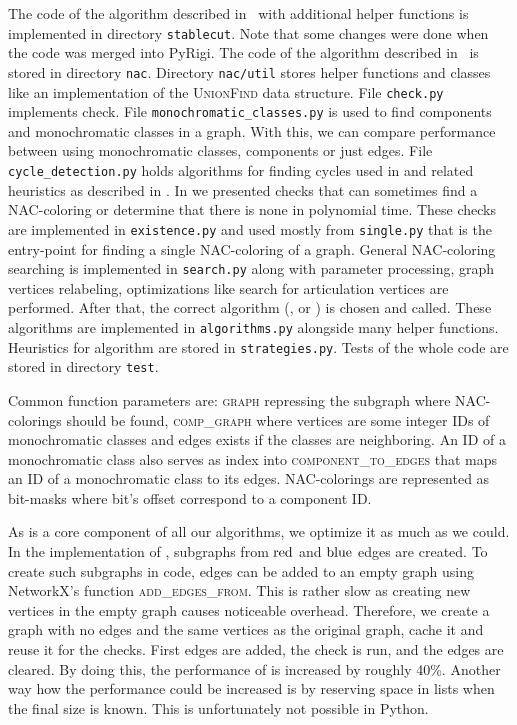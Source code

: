 The code of the algorithm described in~
with additional helper functions is implemented in directory \texttt{stablecut}.
Note that some changes were done when the code was merged into PyRigi.
The code of the algorithm described in~
is stored in directory \texttt{nac}.
Directory \texttt{nac/util} stores helper functions and classes
like an implementation of the \textsc{UnionFind} data structure.
File \texttt{check.py} implements \IsNACColoring{} check.
File \texttt{monochromatic\_classes.py} is used to find \trcon{} components
and monochromatic classes in a graph. With this, we can compare performance
between using monochromatic classes, \trcon{} components or just edges.
File \texttt{cycle\_detection.py} holds algorithms for finding cycles
used in 
and related heuristics as described in .
In 
we presented checks that can sometimes find
a NAC-coloring or determine that there is none in polynomial time.
These checks are implemented in \texttt{existence.py} and
used mostly from \texttt{single.py} that is the entry-point for finding a single NAC-coloring of a graph.
General NAC-coloring searching is implemented in \texttt{search.py}
along with parameter processing, graph vertices relabeling,
optimizations like search for articulation vertices are performed.
After that, the correct algorithm (\Naive{}, \NaiveCycles{} or \Subgraphs{})
is chosen and called.
These algorithms are implemented in \texttt{algorithms.py} alongside many helper functions.
Heuristics for \Subgraphs{} algorithm are stored in \texttt{strategies.py}.
Tests of the whole code are stored in directory \texttt{test}.

Common function parameters are:
\textsc{graph} repressing the subgraph where NAC-colorings should be found,
\textsc{comp\_graph} where vertices are some integer IDs of monochromatic classes
and edges exists if the classes are neighboring.
An ID of a monochromatic class also serves as index into \textsc{component\_to\_edges}
that maps an ID of a monochromatic class to its edges.
NAC-colorings are represented as bit-masks where bit's offset correspond to a component ID.

As \IsNACColoring{} is a core component of all our algorithms, we optimize it as much as we could.
In the implementation of \IsNACColoring{}, subgraphs from \( \text{red} \) and \( \text{blue} \) edges are created.
To create such subgraphs in code, edges can be added to an empty graph
using NetworkX's function \textsc{add\_edges\_from}.
This is rather slow as creating new vertices in the empty graph causes noticeable overhead.
Therefore, we create a graph with no edges and the same vertices as the original graph,
cache it and reuse it for the checks. First edges are added, the check is run, and the edges are cleared.
By doing this, the performance of \IsNACColoring{} is increased by roughly 40\%.
Another way how the performance could be increased is by reserving space in lists
when the final size is known. This is unfortunately not possible in Python.

